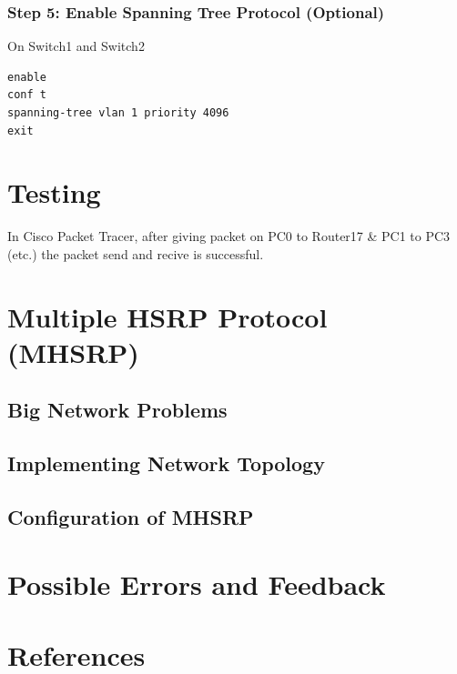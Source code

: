 \documentclass[12pt]{report}
\begin{document}
\subsection*{Step 5: Enable Spanning Tree Protocol (Optional)}
On Switch1 and Switch2
\begin{Verbatim}[fontsize=\small, formatcom=\hackfont\color{black}, frame=single]
enable
conf t
spanning-tree vlan 1 priority 4096
exit
\end{Verbatim}

\newpage

\chapter{Testing}
In Cisco Packet Tracer, after giving packet on PC0 to Router17 \& PC1 to PC3 (etc.) the packet send and recive is successful. 

\chapter{Multiple HSRP Protocol (MHSRP)}
\section{Big Network Problems}
\section{Implementing Network Topology}
\section{Configuration of MHSRP}
\chapter{Possible Errors and Feedback}
\chapter{References}
\end{document}
